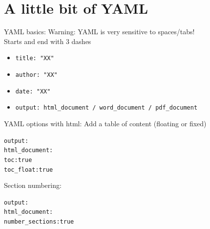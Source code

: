 \documentclass[10pt]{beamer}\usepackage[]{graphicx}\usepackage[]{color}
\makeatletter
\newcommand{\hlopt}[1]{\textcolor[rgb]{0,0,0}{#1}}%
\newcommand{\hlstd}[1]{\textcolor[rgb]{0.345,0.345,0.345}{#1}}%
\newenvironment{kframe}{%
 \def\at@end@of@kframe{}%
 \ifinner\ifhmode%
  \def\at@end@of@kframe{\end{minipage}}%
  \begin{minipage}{\columnwidth}%
 \fi\fi%
 \def\FrameCommand##1{\hskip\@totalleftmargin \hskip-\fboxsep
 \colorbox{shadecolor}{##1}\hskip-\fboxsep
     \hskip-\linewidth \hskip-\@totalleftmargin \hskip\columnwidth}%
 \MakeFramed {\advance\hsize-\width
   \@totalleftmargin\z@ \linewidth\hsize
   \@setminipage}}%
 {\par\unskip\endMakeFramed%
 \at@end@of@kframe}
\newenvironment{knitrout}{}{} %
\makeatother
\begin{document}
\section{A little bit of YAML}

\begin{frame}{YAML basics:}
\alert{Warning: YAML is very sensitive to spaces/tabs!}\\
\pause
Starts and end with 3 dashes
\pause
\begin{itemize}
  \item \texttt{title: "XX"}
  \item \texttt{author: "XX"}
  \item \texttt{date: "XX"}
  \item \texttt{output: html\_document / word\_document / pdf\_document } 
\end{itemize}
\end{frame}

\begin{frame}[fragile]{YAML options with html:}
Add a table of content (floating or fixed)
\begin{knitrout}\small
{}\color{fgcolor}\begin{kframe}
\begin{alltt}
\hlstd{output}\hlopt{:}
  \hlstd{html_document}\hlopt{:}
    \hlstd{toc}\hlopt{:} \hlstd{true}
    \hlstd{toc_float}\hlopt{:} \hlstd{true}
\end{alltt}
\end{kframe}
\end{knitrout}

\pause
Section numbering:
\begin{knitrout}\small
{}\color{fgcolor}\begin{kframe}
\begin{alltt}
\hlstd{output}\hlopt{:}
  \hlstd{html_document}\hlopt{:}
    \hlstd{number_sections}\hlopt{:} \hlstd{true}
\end{alltt}
\end{kframe}
\end{knitrout}

\end{frame}
\end{document}
